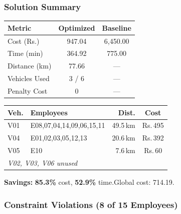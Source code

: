 \documentclass[11pt,a4paper]{article}
\newcommand{\rupee}{Rs.}
\newcommand{\saving}[1]{\textcolor{velgreen}{\textbf{#1}}}
\begin{document}
\subsubsection{Solution Summary}

\begin{minipage}[t]{0.48\textwidth}
\begin{table}[H]
\centering
\begin{tabular}{lcc}
\toprule
\textbf{Metric} & \textbf{Optimized} & \textbf{Baseline} \\
\midrule
\rowcolor{rowalt}
Cost (\rupee) & 947.04 & 6,450.00 \\
Time (min) & 364.92 & 775.00 \\
\rowcolor{rowalt}
Distance (km) & 77.66 & --- \\
Vehicles Used & 3 / 6 & --- \\
\rowcolor{rowalt}
Penalty Cost & 0 & --- \\
\bottomrule
\end{tabular}
\end{table}
\end{minipage}
\hfill
\begin{minipage}[t]{0.48\textwidth}
\begin{table}[H]
\centering
\small
\begin{tabular}{llrc}
\toprule
\textbf{Veh.} & \textbf{Employees} & \textbf{Dist.} & \textbf{Cost} \\
\midrule
\rowcolor{rowalt}
V01 & E08,07,04,14,09,06,15,11 & 49.5\,km & \rupee\,495 \\
V04 & E01,02,03,05,12,13 & 20.6\,km & \rupee\,392 \\
\rowcolor{rowalt}
V05 & E10 & 7.6\,km & \rupee\,60 \\
\multicolumn{4}{l}{\textit{V02, V03, V06 unused}} \\
\bottomrule
\end{tabular}
\end{table}
\end{minipage}

\vspace{4pt}
\textbf{Savings:} \saving{85.3\%} cost, \saving{52.9\%} time.\quad Global cost: 714.19.

\subsubsection{Constraint Violations (8 of 15 Employees)}
\end{document}
